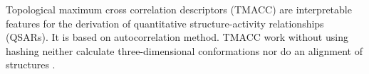 Topological maximum cross correlation descriptors (TMACC) are interpretable features for the derivation of quantitative structure-activity relationships (QSARs). It is based on autocorrelation method. TMACC work without using hashing  neither calculate three-dimensional conformations nor do an alignment of structures \cite{Melville_2007}.